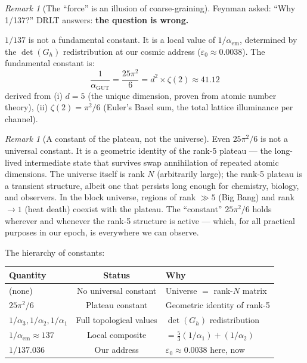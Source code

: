 \documentclass[12pt]{article}
\theoremstyle{remark}
\newtheorem{remark}[theorem]{Remark}
\theoremstyle{definition}
\newcommand{\agut}{\alpha_{\mathrm{GUT}}}
\begin{document}
\begin{remark}[The ``force'' is an illusion of coarse-graining]
Feynman asked: ``Why 1/137?'' DRLT answers: \textbf{the question is wrong.}

$1/137$ is not a fundamental constant. It is a local value of $1/\alpha_\text{em}$, determined by the $\det(G_h)$ redistribution at our cosmic address ($\varepsilon_0 \approx 0.0038$). The fundamental constant is:
\begin{equation}
\boxed{\frac{1}{\agut} = \frac{25\pi^2}{6} = d^2 \times \zeta(2) \approx 41.12}
\end{equation}
derived from (i) $d = 5$ (the unique dimension, proven from atomic number theory), (ii) $\zeta(2) = \pi^2/6$ (Euler's Basel sum, the total lattice illuminance per channel).

\begin{remark}[A constant of the plateau, not the universe]
Even $25\pi^2/6$ is not a universal constant. It is a geometric identity of the rank-5 plateau --- the long-lived intermediate state that survives swap annihilation of repeated atomic dimensions. The universe itself is rank $N$ (arbitrarily large); the rank-5 plateau is a transient structure, albeit one that persists long enough for chemistry, biology, and observers. In the block universe, regions of rank $\gg 5$ (Big Bang) and rank $\to 1$ (heat death) coexist with the plateau. The ``constant'' $25\pi^2/6$ holds wherever and whenever the rank-5 structure is active --- which, for all practical purposes in our epoch, is everywhere we can observe.

The hierarchy of constants:

\begin{center}
\begin{tabular}{lcl}
\hline
Quantity & Status & Why \\
\hline
(none) & No universal constant & Universe $=$ rank-$N$ matrix \\
$25\pi^2/6$ & Plateau constant & Geometric identity of rank-5 \\
$1/\alpha_3, 1/\alpha_2, 1/\alpha_1$ & Full topological values & $\det(G_h)$ redistribution \\
$1/\alpha_\text{em} \approx 137$ & Local composite & $= \tfrac{5}{3}(1/\alpha_1) + (1/\alpha_2)$ \\
$1/137.036$ & Our address & $\varepsilon_0 \approx 0.0038$ here, now \\
\hline
\end{tabular}
\end{center}
\end{remark}


\end{remark}
\end{document}
